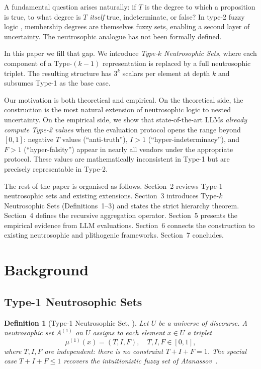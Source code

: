 \documentclass[10pt,a4paper]{article}
\newtheorem{definition}{Definition}
\begin{document}
A fundamental question arises naturally: if $T$ is the degree to
which a proposition is true, to what degree is $T$ \emph{itself}
true, indeterminate, or false? In type-2 fuzzy logic
\cite{mendel2002type2}, membership degrees are themselves fuzzy
sets, enabling a second layer of uncertainty. The neutrosophic
analogue has not been formally defined.

In this paper we fill that gap. We introduce \emph{Type-$k$
Neutrosophic Sets}, where each component of a Type-$(k-1)$
representation is replaced by a full neutrosophic triplet.
The resulting structure has $3^k$ scalars per element
at depth $k$ and subsumes Type-1 as the base case.

Our motivation is both theoretical and empirical. On the theoretical
side, the construction is the most natural extension of neutrosophic
logic to nested uncertainty. On the empirical side, we show that
state-of-the-art LLMs \emph{already compute Type-2 values} when the
evaluation protocol opens the range beyond $[0,1]$: negative $T$
values (``anti-truth''), $I > 1$ (``hyper-indeterminacy''), and
$F > 1$ (``hyper-falsity'') appear in nearly all vendors under the
appropriate protocol. These values are mathematically inconsistent
in Type-1 but are precisely representable in Type-2.

The rest of the paper is organised as follows. Section~2 reviews
Type-1 neutrosophic sets and existing extensions.
Section~3 introduces Type-$k$ Neutrosophic Sets (Definitions~1--3)
and states the strict hierarchy theorem. Section~4 defines the
recursive aggregation operator. Section~5 presents the empirical
evidence from LLM evaluations. Section~6 connects the construction
to existing neutrosophic and plithogenic frameworks.
Section~7 concludes.

\section{Background}

\subsection{Type-1 Neutrosophic Sets}

\begin{definition}[Type-1 Neutrosophic Set, \cite{smarandache1998neutrosophy}]
Let $U$ be a universe of discourse. A \emph{neutrosophic set}
$A^{(1)}$ on $U$ assigns to each element $x \in U$ a triplet
\[
  \mu^{(1)}(x) = (T, I, F), \quad T, I, F \in [0,1],
\]
where $T, I, F$ are independent: there is no constraint
$T + I + F = 1$.
The special case $T + I + F \leq 1$ recovers the
intuitionistic fuzzy set of Atanassov~\cite{atanassov1986ifs}.
\end{definition}
\end{document}
